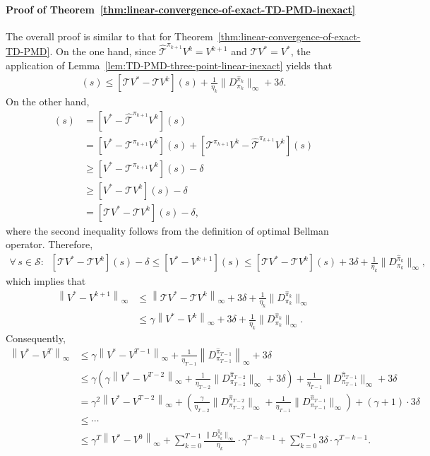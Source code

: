 \documentclass[10pt]{article}
\newcommand{\calS}{\mathcal{S}}
\newcommand{\calT}{\mathcal{T}}
\newcommand{\ls}{\left}
\newcommand{\rs}{\right}
\theoremstyle{plain}
\theoremstyle{definition}
\begin{document}
\paragraph{Proof of Theorem~\ref{thm:linear-convergence-of-exact-TD-PMD-inexact}} The overall proof is similar to that for Theorem~\ref{thm:linear-convergence-of-exact-TD-PMD}. On the one hand, since $\widehat{\calT}^{\pi_{k+1}}V^k = V^{k+1}$ and $\calT V^* = V^*$, the application of Lemma~\ref{lem:TD-PMD-three-point-linear-inexact} yields that 
\begin{align*}
    [V^* - V^{k+1}](s) \leq [\calT V^* - \calT V^k](s) + \frac{1}{\eta_k} \| {D}_{\pi_k}^{\widehat{\pi}_k} \|_\infty + 3\delta.
\end{align*}
On the other hand, 
\begin{align*}
    [V^* - V^{k+1}](s) &= [V^* - \widehat{\calT}^{\pi_{k+1}}V^k](s) \\
    &= [V^* - \calT^{\pi_{k+1}}V^k](s) + [\calT^{\pi_{k+1}}V^k - \widehat{\calT}^{\pi_{k+1}}V^k](s) \\
    &\geq [V^* - \calT^{\pi_{k+1}}V^k](s) - \delta \\
    &\geq [V^* - \calT V^k](s) - \delta \\
    &= [\calT V^* - \calT V^k](s) - \delta,
\end{align*}
where the second inequality follows from the definition of optimal Bellman operator. Therefore,
\begin{align*}
    \forall\, s\in\calS: \;\; [\calT V^* - \calT V^k](s) - \delta \leq [V^* - V^{k+1}](s) \leq [\calT V^* - \calT V^k](s) + 3\delta + \frac{1}{\eta_k} \| D_{\pi_k}^{\widehat{\pi}_k} \|_\infty,
\end{align*}
which implies that
\begin{align*}
    \ls\| V^* - V^{k+1} \rs\|_\infty &\leq \ls\| \calT V^* - \calT V^k \rs\|_\infty + 3\delta + \frac{1}{\eta_k} \| {D}_{\pi_k}^{\widehat{\pi}_k} \|_\infty \\
    &\leq \gamma \ls\| V^* - V^k \rs\|_\infty + 3\delta + \frac{1}{\eta_k} \| {D}_{\pi_k}^{\widehat{\pi}_k} \|_\infty.
\end{align*}
Consequently,
\begin{align*}
    \ls\| V^* - V^{T} \rs\|_\infty &\leq \gamma \ls\| V^* - V^{T-1} \rs\|_\infty + \frac{1}{\eta_{T-1}} \ls\| {D}_{\pi_{T-1}}^{\widehat{\pi}_{T-1}} \rs\|_\infty + 3\delta \\
    &\leq \gamma \ls( \gamma \ls\| V^* - V^{T-2} \rs\|_\infty + \frac{1}{\eta_{T-2}} \| {D}_{\pi_{T-2}}^{\widehat{\pi}_{T-2}} \|_\infty +3\delta \rs) + \frac{1}{\eta_{T-1}} \| {D}_{\pi_{T-1}}^{\widehat{\pi}_{T-1}} \|_\infty + 3\delta \\
    &= \gamma^2 \ls\| V^* - V^{T-2} \rs\|_\infty + \ls( \frac{\gamma}{\eta_{T-2}} \| {D}_{\pi_{T-2}}^{\widehat{\pi}_{T-2}} \|_\infty + \frac{1}{\eta_{T-1}} \| {D}_{\pi_{T-1}}^{\widehat{\pi}_{T-1}} \|_\infty \rs) + (\gamma + 1) \cdot 3\delta\\
    &\leq \cdots \\
    &\leq \gamma^T \ls\| V^* - V^0 \rs\|_\infty + \sum_{k=0}^{T-1} \frac{\| {D}_{\pi_k}^{\widehat{\pi}_k} \|_\infty}{\eta_k} \cdot \gamma ^{T-k-1} + \sum_{k=0}^{T-1}3\delta \cdot \gamma^{T-k-1}.
\end{align*}
\end{document}
